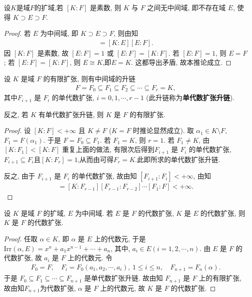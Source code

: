 \documentclass[../../main.tex]{subfiles}%
\begin{document}
\begin{corollary}
设$K$是域$F$的扩域,若 $[K:F]$ 是素数, 则 $K$ 与 $F$ 之间无中间域, 即不存在域 $E$, 使得 $K\supset E\supset F$.
\end{corollary}
\begin{proof}
若 $E$ 为中间域, 即 $K\supset E\supset F$, 则由知
\begin{align*}
[K:F]=[K:E][E:F].
\end{align*}
因 $[K:F]$ 是素数, 故 $[E:F]=1$ 或 $[E:F]=[K:F]$. 若 $[E:F]=1$, 则 $E=F$; 若 $[E:F]=[K:F]$, 则 $E\cong K$,即$E=K$. 这都导出矛盾, 故本推论成立.
\end{proof}

\begin{corollary}\label{corollary:抽象代数--推论3.2.111}
设 $K$ 是域 $F$ 的有限扩张, 则有中间域的升链
\begin{align*}
F=F_0\subseteq F_1\subseteq F_2\subseteq\cdots\subseteq F_r=K,
\end{align*}
其中$F_{i+1}$ 是 $F_i$ 的单代数扩张, $i=0,1,\cdots,r-1$ (此升链称为\textbf{单代数扩张升链}).

反之, 若 $K$ 有单代数扩张升链, 则 $K$ 是 $F$ 的有限扩张.
\end{corollary}

\begin{proof}
设 $[K:F]<+\infty$ 且 $K\neq F$ ($K=F$ 时推论显然成立). 取 $\alpha_1\in K\setminus F$, $F_1=F(\alpha_1)$. 于是 $F=F_0\subseteq F_1$. 若 $F_1=K$, 则 $r=1$. 若 $F_1\neq K$, 由 $[K:F_1]<[K:F]$ 重复上面的做法, 有限次后得到$F_{i+1}$ 是 $F_i$ 的单代数扩张,$F_{i+1}\subseteq F_i$且$[K:F_r]=1$,从而由可得$F_r=K$.此即所求的单代数扩张升链.

反之, 由于 $F_{i+1}$ 是 $F_i$ 的单代数扩张, 故由知 $[F_{i+1}:F_i]<+\infty$, 由知
\begin{align*}
[K:F]=[K:F_{r-1}][F_{r-1}:F_{r-2}]\cdots[F_1:F]<+\infty.
\end{align*}

\end{proof}

\begin{corollary}\label{corollary:抽象代数--推论3.2.4}
设 $K$ 是域 $F$ 的扩域, $E$ 为中间域. 若 $E$ 是 $F$ 的代数扩张, $K$ 是 $E$ 的代数扩张, 则 $K$ 是 $F$ 的代数扩张.
\end{corollary}
\begin{proof}
任取 $\alpha\in K$, 即 $\alpha$ 是 $E$ 上的代数元, 于是 $\mathrm{Irr}(\alpha,E)=x^n+a_1x^{n-1}+\cdots+a_n$, 其中, $a_i\in E(i=1,2,\cdots,n)$. 由 $E$ 是 $F$ 的代数扩张, 故 $a_i$ 是 $F$ 上的代数元. 令
\begin{align*}
F_0=F,\quad F_i=F_0(a_1,a_2,\cdots,a_i),\ 1\leqslant i\leqslant n,\quad F_{n+1}=F_n(\alpha).
\end{align*}
于是 $F_0\subseteq F_1\subseteq\cdots\subseteq F_{n+1}$ 是单代数扩张升链. 故由知 $F_{n+1}$ 是 $F$ 上的有限扩张, 故由知$F_{n+1}$为代数扩张, $\alpha$ 是 $F$ 上的代数元, 故 $K$ 是 $F$ 的代数扩张.

\end{proof}
\end{document}
